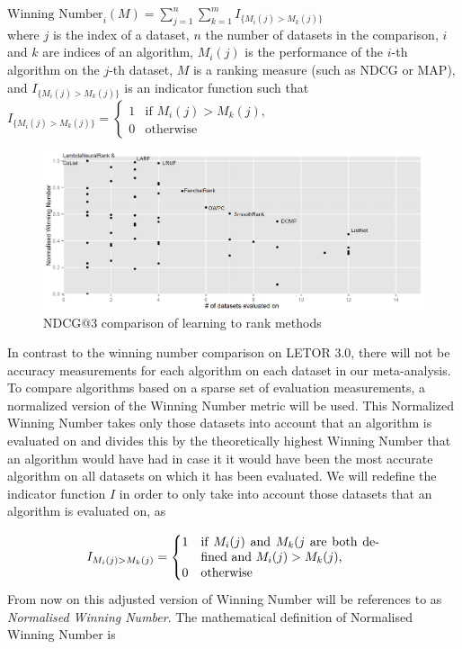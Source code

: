 \documentclass{sig-alternate-2013}
\begin{document}
$\text{Winning Number}_i(M) = \sum\nolimits_{j=1}^n \sum\nolimits_{k=1}^m I_{\{M_i(j)>M_k(j)\}}$\\

where $j$ is the index of a dataset, $n$ the number of datasets in the comparison, $i$ and $k$ are indices of an algorithm, $M_i(j)$ is the performance of the $i$-th algorithm on the $j$-th dataset, $M$ is a ranking measure (such as NDCG or MAP), and $I_{\{M_i(j)>M_k(j)\}}$ is an indicator function such that\\

$I_{\{M_i(j)>M_k(j)\}} = \begin{cases}
1 & \text{if } M_i(j) > M_k(j), \\
0 & \text{otherwise}
\end{cases}$\\

\begin{figure}
\includegraphics[scale=0.371]{gfx/ndcg3_winnum}
\caption{NDCG@3 comparison of learning to rank methods}
\label{fig:normalised_winning_number_ndcg3}
\end{figure}
In contrast to the winning number comparison on LETOR 3.0, there will not be accuracy measurements for each algorithm on each dataset in our meta-analysis. To compare algorithms based on a sparse set of evaluation measurements, a normalized version of the Winning Number metric will be used. This Normalized Winning Number takes only those datasets into account that an algorithm is evaluated on and divides this by the theoretically highest Winning Number that an algorithm would have had in case it it would have been the most accurate algorithm on all datasets on which it has been evaluated. We will redefine the indicator function $I$ in order to only take into account those datasets that an algorithm is evaluated on, as

\[
I_{M_i(j)>M_k(j)} = \begin{cases}
1 & \parbox[t]{5cm}{if $M_i(j)$ and $M_k(j$ are both defined and $M_i(j) > M_k(j)$,}\\
0 & \parbox[t]{5cm}{otherwise}
\end{cases}
\]
From now on this adjusted version of Winning Number will be references to as \emph{Normalised Winning Number}. The mathematical definition of Normalised Winning Number is\\
\end{document}
